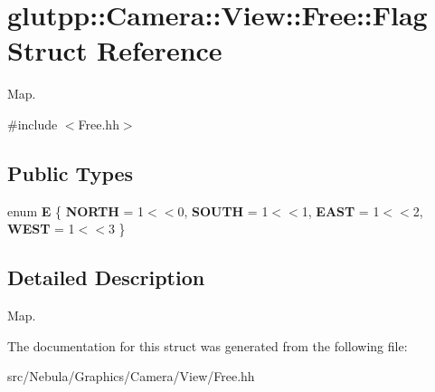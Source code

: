 \hypertarget{structglutpp_1_1Camera_1_1View_1_1Free_1_1Flag}{\section{glutpp\-:\-:Camera\-:\-:View\-:\-:Free\-:\-:Flag Struct Reference}
\label{structglutpp_1_1Camera_1_1View_1_1Free_1_1Flag}
}


Map.  




{\ttfamily \#include $<$Free.\-hh$>$}

\subsection*{Public Types}
\begin{DoxyCompactItemize}
\item 
enum {\bfseries E} \{ {\bfseries N\-O\-R\-T\-H} = 1$<$$<$0, 
{\bfseries S\-O\-U\-T\-H} = 1$<$$<$1, 
{\bfseries E\-A\-S\-T} = 1$<$$<$2, 
{\bfseries W\-E\-S\-T} = 1$<$$<$3
 \}
\end{DoxyCompactItemize}


\subsection{Detailed Description}
Map. 

The documentation for this struct was generated from the following file\-:\begin{DoxyCompactItemize}
\item 
src/\-Nebula/\-Graphics/\-Camera/\-View/Free.\-hh\end{DoxyCompactItemize}
